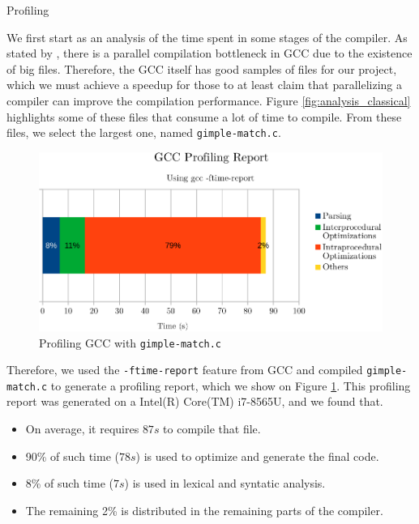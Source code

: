 \begin{section}{Profiling}\label{sec:profile}

We first start as an analysis of the time spent in some stages of the compiler.
As stated by \cite{PR84402}, there is a parallel compilation bottleneck in GCC
due to the existence of big files. Therefore, the GCC itself has good samples
of files for our project, which we must achieve a speedup for those to at least
claim that parallelizing a compiler can improve the compilation performance.
Figure \ref{fig:analysis_classical} highlights some of these files that consume
a lot of time to compile. From these files, we select the largest one, named
\texttt{gimple-match.c}.

\begin{figure}
\centering
	 \includegraphics[scale=1.0]{figuras/profiling-crop.pdf}
	  \caption{Profiling GCC with \texttt{gimple-match.c}}
	  \label{fig:gcc_profiling}
\end{figure}

Therefore, we used the \texttt{-ftime-report} feature from GCC and compiled
\texttt{gimple-match.c} to generate a profiling report, which we show on Figure
\ref{fig:gcc_profiling}. This profiling report was generated on a
Intel(R) Core(TM) i7-8565U, and we found that.
\begin{itemize}
    \item On average, it requires $87s$ to compile that file.

    \item 90\% of such time ($78s$) is used to optimize and generate the final code.

    \item 8\% of such time ($7s$) is used in lexical and syntatic analysis.

    \item The remaining 2\% is distributed in the remaining parts of the compiler.
\end{itemize}


\end{section}
